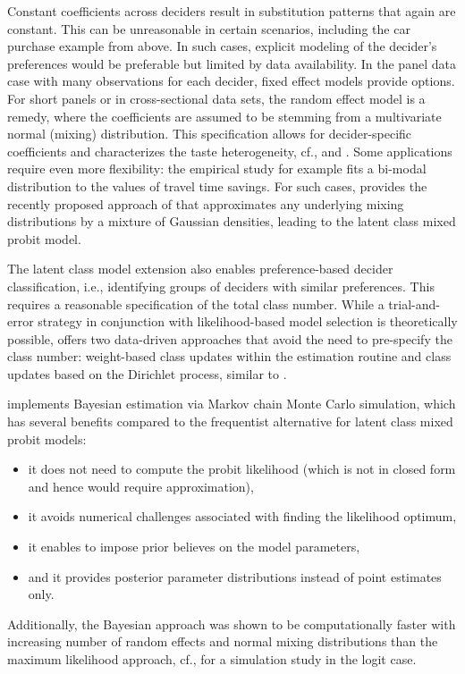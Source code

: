 \documentclass[article,shortnames]{jss}
\begin{document}
Constant coefficients across deciders result in substitution patterns that again are constant. This can be unreasonable in certain scenarios, including the car purchase example from above. In such cases, explicit modeling of the decider's preferences would be preferable but limited by data availability. In the panel data case with many observations for each decider, fixed effect models provide options. For short panels or in cross-sectional data sets, the random effect model is a remedy, where the coefficients are assumed to be stemming from a multivariate normal (mixing) distribution. This specification allows for decider-specific coefficients and characterizes the taste heterogeneity, cf., \cite{Train:2009} and \cite{Bhat:2011}. Some applications require even more flexibility: the empirical study \cite{Cirillo:2006} for example fits a bi-modal distribution to the values of travel time savings. For such cases,  provides the recently proposed approach of \cite{Oelschlaeger:2020} that approximates any underlying mixing distributions by a mixture of Gaussian densities, leading to the latent class mixed probit model.

The latent class model extension also enables preference-based decider classification, i.e., identifying groups of deciders with similar preferences. This requires a reasonable specification of the total class number. While a trial-and-error strategy in conjunction with likelihood-based model selection is theoretically possible,  offers two data-driven approaches that avoid the need to pre-specify the class number: weight-based class updates within the estimation routine \citep{Oelschlaeger:2020} and class updates based on the Dirichlet process, similar to \cite{Burda:2008}.

 implements Bayesian estimation via Markov chain Monte Carlo simulation, which has several benefits compared to the frequentist alternative for latent class mixed probit models:
\begin{itemize}
  \item it does not need to compute the probit likelihood (which is not in closed form and hence would require approximation),
  \item it avoids numerical challenges associated with finding the likelihood optimum,
  \item it enables to impose prior believes on the model parameters,
  \item and it provides posterior parameter distributions instead of point estimates only.
\end{itemize}
Additionally, the Bayesian approach was shown to be computationally faster with increasing number of random effects and normal mixing distributions than the maximum likelihood approach, cf., \cite{Train:2001} for a simulation study in the logit case.
\end{document}
